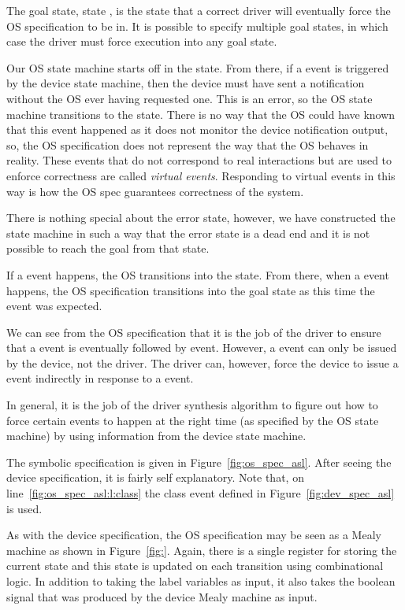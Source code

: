 The goal state, state , is the state that a correct driver will eventually force the OS specification to be in. It is possible to specify multiple goal states, in which case the driver must force execution into any goal state.

Our OS state machine starts off in the  state. From there, if a  event is triggered by the device state machine, then the device must have sent a notification without the OS ever having requested one. This is an error, so the OS state machine transitions to the  state. There is no way that the OS could have known that this event happened as it does not monitor the device notification output, so, the OS specification does not represent the way that the OS behaves in reality. These events that do not correspond to real interactions but are used to enforce correctness are called \emph{virtual events}. Responding to virtual events in this way is how the OS spec guarantees correctness of the system. 

There is nothing special about the error state, however, we have constructed the state machine in such a way that the error state is a dead end and it is not possible to reach the goal from that state.

If a  event happens, the OS transitions into the  state. From there, when a  event happens, the OS specification transitions into the goal state as this time the  event was expected. 

We can see from the OS specification that it is the job of the driver to ensure that a  event is eventually followed by  event. However, a  event can only be issued by the device, not the driver. The driver can, however, force the device to issue a  event indirectly in response to a  event. 

In general, it is the job of the driver synthesis algorithm to figure out how to force certain events to happen at the right time (as specified by the OS state machine) by using information from the device state machine. 

The symbolic specification is given in Figure~\ref{fig:os_spec_asl}. After seeing the device specification, it is fairly self explanatory. Note that, on line~\ref{fig:os_spec_asl:l:class} the class event defined in Figure~\ref{fig:dev_spec_asl} is used.

As with the device specification, the OS specification may be seen as a Mealy machine as shown in Figure~\ref{fig:}. Again, there is a single register for storing the current state and this state is updated on each transition using combinational logic. In addition to taking the label variables as input, it also takes the  boolean signal that was produced by the device Mealy machine as input. 

